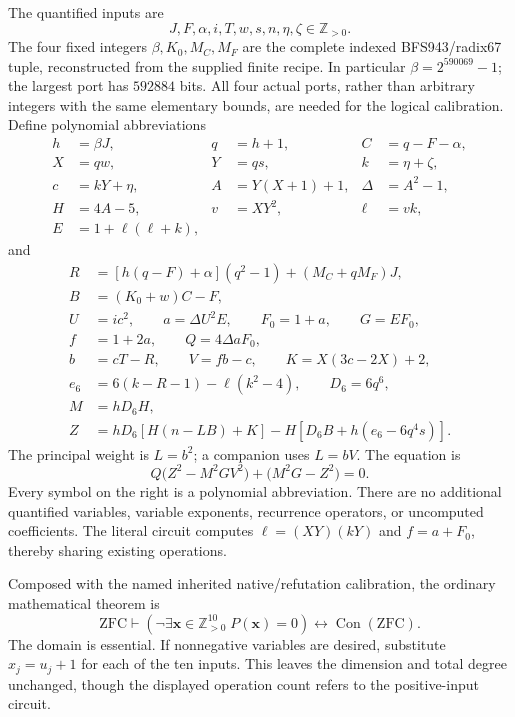 The quantified inputs are
\[
 J,F,\alpha,i,T,w,s,n,\eta,\zeta\in\mathbb Z_{>0}.
\]
The four fixed integers $\beta,K_0,M_C,M_F$ are the complete indexed
BFS943/radix67 tuple, reconstructed from the supplied finite recipe.
In particular $\beta=2^{590069}-1$; the largest port has $592884$ bits.
All four actual ports, rather than arbitrary integers with the same
elementary bounds, are needed for the logical calibration.
Define polynomial abbreviations
\begin{align*}
 h&=\beta J,&q&=h+1,& C&=q-F-\alpha,\\
 X&=qw,&Y&=qs,&k&=\eta+\zeta,\\
 c&=kY+\eta,&A&=Y(X+1)+1,&\Delta&=A^2-1,\\
 H&=4A-5,&v&=XY^2,&\ell&=vk,\\
 E&=1+\ell(\ell+k),&&&
\end{align*}
and
\begin{align*}
 R&=[h(q-F)+\alpha](q^2-1)+(M_C+qM_F)J,\\
 B&=(K_0+w)C-F,\\
 U&=ic^2,\qquad a=\Delta U^2E,\qquad F_0=1+a,\qquad G=EF_0,\\
 f&=1+2a,\qquad Q=4\Delta aF_0,\\
 b&=cT-R,\qquad V=fb-c,\qquad K=X(3c-2X)+2,\\
 e_6&=6(k-R-1)-\ell(k^2-4),\qquad D_6=6q^6,\\
 M&=hD_6H,\\
 Z&=hD_6[H(n-LB)+K]-H[D_6B+h(e_6-6q^4s)] .
\end{align*}
The principal weight is $L=b^2$; a companion uses $L=bV$.
The equation is
\begin{equation}
 \boxed{\;Q\bigl(Z^2-M^2GV^2\bigr)+\bigl(M^2G-Z^2\bigr)=0.\;}
 \label{eq:compact232}
\end{equation}
Every symbol on the right is a polynomial abbreviation.  There are no
additional quantified variables, variable exponents, recurrence operators,
or uncomputed coefficients.  The literal circuit computes
$\ell=(XY)(kY)$ and $f=a+F_0$, thereby sharing existing operations.

Composed with the named inherited native/refutation calibration, the
ordinary mathematical theorem is
\[
 \mathrm{ZFC}\vdash
 \left(\neg\exists\boldsymbol{x}\in\mathbb Z_{>0}^{10}\;
 P(\boldsymbol{x})=0\right)
 \longleftrightarrow\operatorname{Con}(\mathrm{ZFC}).
\]
The domain is essential.  If nonnegative variables are desired, substitute
$x_j=u_j+1$ for each of the ten inputs.  This leaves the dimension and
total degree unchanged, though the displayed operation count refers to
the positive-input circuit.

